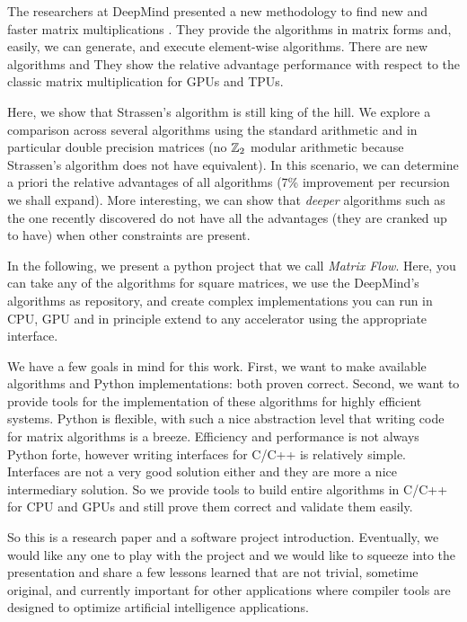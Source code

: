 \documentclass[acmsmall]{acmart}
\begin{document}
The researchers at DeepMind presented a new methodology to find new
and faster matrix multiplications \cite{PMID:36198780}. They provide
the algorithms in matrix forms and, easily, we can generate, and
execute element-wise algorithms.  There are new algorithms and They
show the relative advantage performance with respect to the classic
matrix multiplication for GPUs and TPUs. 

Here, we show that Strassen's algorithm \cite{STRASSEN1969} is still
king of the hill.  We explore a comparison across several algorithms
using the standard arithmetic and in particular double precision
matrices (no $\mathbb{Z}_2$ modular arithmetic because Strassen's algorithm
does not have equivalent). In this scenario, we can determine a priori
the relative advantages of all algorithms (7\% improvement per
recursion we shall expand). More interesting, we can show that {\em
  deeper} algorithms such as the one recently discovered do not have
all the advantages (they are cranked up to have) when other
constraints are present.

In the following, we present a python project that we call {\em Matrix
  Flow}. Here, you can take any of the algorithms for square matrices,
we use the DeepMind's algorithms as repository, and create complex
implementations you can run in CPU, GPU and in principle extend to any
accelerator using the appropriate interface. 

We have a few goals in mind for this work. First, we want to make
available algorithms and Python implementations: both proven
correct. Second, we want to provide tools for the implementation of
these algorithms for highly efficient systems. Python is flexible,
with such a nice abstraction level that writing code for matrix
algorithms is a breeze. Efficiency and performance is not always
Python forte, however writing interfaces for C/C++ is relatively
simple. Interfaces are not a very good solution either and they are
more a nice intermediary solution. So we provide tools to build entire
algorithms in C/C++ for CPU and GPUs and still prove them correct and
validate them easily.

So this is a research paper and a software project
introduction. Eventually, we would like any one to play with the
project and we would like to squeeze into the presentation and share a
few lessons learned that are not trivial, sometime original, and
currently important for other applications where compiler tools are
designed to optimize artificial intelligence applications.
\end{document}
